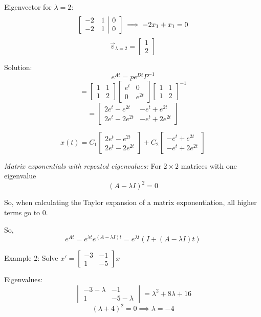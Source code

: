 \documentclass[12pt]{article}
\begin{document}
Eigenvector for $\lambda = 2$:
\[\left[\begin{array}{c c |c}
    -2 & 1 & 0\\
    -2 & 1 & 0
\end{array}\right] \implies -2x_1 + x_1 = 0\]
\[\vec{v}_{\lambda = 2} = \begin{bmatrix}
    1\\
    2
\end{bmatrix}\]

Solution:
\[e^{At} = pe^{Dt}P^{-1}\]
\[ = \begin{bmatrix}
    1 & 1\\
    1 & 2
\end{bmatrix} \begin{bmatrix}
    e^t & 0\\
    0 & e^{2t}
\end{bmatrix} \begin{bmatrix}
    1 & 1\\
    1 & 2
\end{bmatrix}^{-1}\]
\[= \begin{bmatrix}
    2e^t - e^{2t} & -e^t + e^{2t}\\
    2e^t - 2e^{2t} & -e^t + 2e^{2t}
\end{bmatrix}\]

\[\boxed{x(t) = C_1 \begin{bmatrix}
    2e^t - e^{2t}\\
    2e^t - 2e^{2t}
\end{bmatrix} + C_2 \begin{bmatrix}
    -e^t + e^{2t}\\
    -e^t + 2e^{2t}
\end{bmatrix}}\]

\emph{Matrix exponentials with repeated eigenvalues:}
For $2 \times 2$ matrices with one eigenvalue 
\[(A - \lambda I)^2 = 0\]

So, when calculating the Taylor expansion of a matrix exponentiation, all higher terms go to 0. 

So, 
\[e^{At} = e^{\lambda t}e^{(A - \lambda I) t} = e^{\lambda t} \left(I + (A - \lambda I)t\right)\]

Example 2: Solve $x' = \begin{bmatrix}
    -3 & -1\\
    1 & -5
\end{bmatrix}x$

Eigenvalues:
\[\begin{vmatrix}
    -3 - \lambda & -1\\
    1 & -5 - \lambda
\end{vmatrix} = \lambda^2 + 8\lambda + 16\]
\[(\lambda + 4)^2 = 0 \implies \lambda = -4\]
\end{document}
